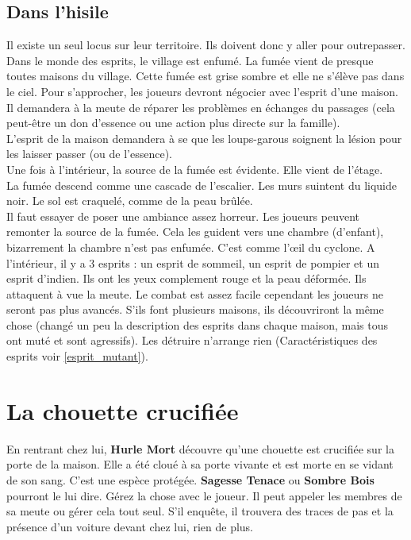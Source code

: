 \documentclass[oneside,12pt]{book}
\newcommand{\Jessica}{\textbf{Sagesse Tenace} }
\newcommand{\Peter}{\textbf{Hurle Mort} }
\newcommand{\Leonard}{\textbf{Sombre Bois} }
\begin{document}
\begin{flushleft}
\subsection{Dans l'hisile}
\label{hisile_enquete}
Il existe un seul locus sur leur territoire. Ils doivent donc y aller pour outrepasser.
Dans le monde des esprits, le village est enfumé. La fumée vient de presque toutes maisons du village. Cette fumée est grise sombre et elle ne s'élève pas dans le ciel.
Pour s'approcher, les joueurs devront négocier avec l'esprit d'une maison. Il demandera à la meute de réparer les problèmes en échanges du passages (cela peut-être un don d'essence ou une action plus directe sur la famille). \\
L'esprit de la maison demandera à se que les loups-garous soignent la lésion pour les laisser passer (ou de l'essence).\\
Une fois à l'intérieur, la source de la fumée est évidente. Elle vient de l'étage.\\
La fumée descend comme une cascade de l'escalier. Les murs suintent du liquide noir. Le sol est craquelé, comme de la peau brûlée.\\
Il faut essayer de poser une ambiance assez horreur. Les joueurs peuvent remonter la source de la fumée. Cela les guident vers une chambre (d'enfant), bizarrement la chambre n'est pas enfumée. C'est comme l’œil du cyclone. A l'intérieur, il y a 3 esprits : un esprit de sommeil, un esprit de pompier et un esprit d'indien. Ils ont les yeux complement rouge et la peau déformée. Ils attaquent à vue la meute. Le combat est assez facile cependant les joueurs ne seront pas plus avancés. S'ils font plusieurs maisons, ils découvriront la même chose (changé un peu la description des esprits dans chaque maison, mais tous ont muté et sont agressifs). Les détruire n'arrange rien (Caractéristiques des esprits voir \ref{esprit_mutant}). 

\section{La chouette crucifiée}
\label{chouette}
En rentrant chez lui, \Peter découvre qu'une chouette est crucifiée sur la porte de la maison. Elle a été cloué à sa porte vivante et est morte en se vidant de son sang. C'est une espèce protégée. \Jessica ou \Leonard pourront le lui dire. Gérez la chose avec le joueur. Il peut appeler les membres de sa meute ou gérer cela tout seul. S'il enquête, il trouvera des traces de pas et la présence d'un voiture devant chez lui, rien de plus.


\end{flushleft}
\end{document}
